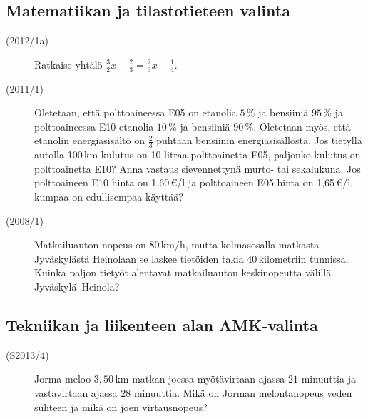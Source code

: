 \subsection*{Matematiikan ja tilastotieteen valinta}

\begin{description}
	\item[(2012/1a)] Ratkaise yhtälö $\frac{3}{2}x - \frac{2}{3} = \frac{2}{3}x - \frac{1}{4}$.
	\item[(2011/1)] Oletetaan, että polttoaineessa E05 on etanolia $5$\,\% ja bensiiniä $95$\,\% ja polttoaineessa E10 etanolia $10$\,\% ja bensiiniä $90$\,\%.
        Oletetaan myös, että etanolin energiasisältö on $\frac{2}{3}$ puhtaan bensiinin
		energiasisällöstä. Jos tietyllä autolla 100\,km kulutus on 10 litraa
        polttoainetta E05, paljonko kulutus on polttoainetta E10? Anna vastaus
        sievennettynä murto- tai sekalukuna. Jos polttoaineen E10 hinta on 1,60\,€/l
        ja polttoaineen E05 hinta on 1,65\,€/l, kumpaa on edullisempaa käyttää?
	\item[(2008/1)] Matkailuauton nopeus on 80\,km/h, mutta kolmasosalla matkasta
        Jyväskylästä Heinolaan se laskee tietöiden takia 40\,kilometriin tunnissa.
        Kuinka paljon tietyöt alentavat matkailuauton keskinopeutta välillä Jyväskylä--Heinola?
\end{description}

\subsection*{Tekniikan ja liikenteen alan AMK-valinta}

\begin{description}
	\item[(S2013/4)] Jorma meloo $3,50$\,km matkan joessa myötävirtaan ajassa $21$ minuuttia ja vastavirtaan ajassa $28$ minuuttia. Mikä on Jorman melontanopeus veden suhteen ja mikä on joen virtausnopeus?
\end{description}

